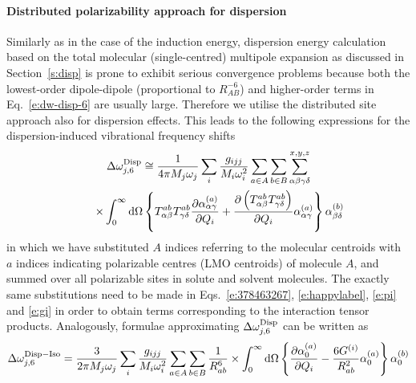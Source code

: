 \documentclass[a4paper,titlepage,twoside,fleqn,12pt]{book}
\begin{document}
\begin{refsection}
\paragraph{Distributed polarizability approach for dispersion\label{s:disp-distributed}}
Similarly as in the case of the induction energy, 
dispersion energy calculation based on the total molecular (single\hyp{}centred)
multipole expansion as discussed in Section~\ref{s:disp} 
is prone to exhibit serious convergence problems because
both the lowest\hyp{}order 
dipole\hyp{}dipole (proportional to $R^{-6}_{AB}$) 
and higher\hyp{}order terms in Eq.~\eqref{e:dw-disp-6} 
are usually large. Therefore we utilise the distributed site 
approach also for dispersion effects. \citep{Adamovic.Gordon.MolPhys.2005}
This leads to the following expressions for the 
dispersion\hyp{}induced vibrational frequency shifts 
%
\begin{multline} \label{e:dw-disp-6-distr-working}
    \Delta\omega_{j,6}^{\rm Disp} \cong 
       \frac{1}{4\pi M_j\omega_j}\sum_i \frac{g_{ijj}}{M_i\omega_i^2} 
       \sum_{a\in  A}\sum_{b\in B}
       \sum_{\alpha\beta\gamma\delta}^{x,y,z}  \\ 
    \qquad \times \int_{0}^{\infty} {\rm d}\Omega
       \left\{
         T^{ab}_{\alpha\beta}T^{ab}_{\gamma\delta}
           \frac{\partial \alpha_{\alpha\gamma}^{(a)}}{\partial Q_i}
            +
           \frac{\partial \left(T^{ab}_{\alpha\beta}T^{ab}_{\gamma\delta}\right)}{\partial Q_i}
          \alpha_{\alpha\gamma}^{(a)}
      \right\}
      \alpha_{\beta\delta}^{(b)}   
\end{multline}
%
in which we have substituted $A$ indices referring to the molecular centroids
with $a$ indices indicating polarizable centres (LMO centroids) 
of molecule $A$, and summed over all polarizable sites in solute
and solvent molecules. The exactly same substitutions need to be made
in Eqs.~\eqref{e:378463267}, \eqref{e:happylabel}, \eqref{e:pi}  and \eqref{e:gi}
in order to obtain terms corresponding to the interaction tensor products.
Analogously, formulae approximating $\Delta\omega_{j,6}^{\rm Disp}$ 
can be written as
%
\begin{equation} \label{e:dw-disp-6-iso-distributed}
\Delta \omega_{j,6}^{\rm Disp-Iso} = \frac{3}{2\pi M_j\omega_j}
\sum_i \frac{g_{ijj}}{M_i\omega_i^2} 
\sum_{a\in  A}\sum_{b\in B}
\frac{1}{R^6_{ab}} \times
\int_{0}^{\infty} {\rm d}\Omega \left\{ 
\frac{\partial \alpha_0^{(a)}}{\partial Q_i}- 
\frac{6G^{(i)}}{R^2_{ab}} 
\alpha_0^{(a)}
\right\}
\alpha_0^{(b)} 
\end{equation}

\end{refsection}
\end{document}
